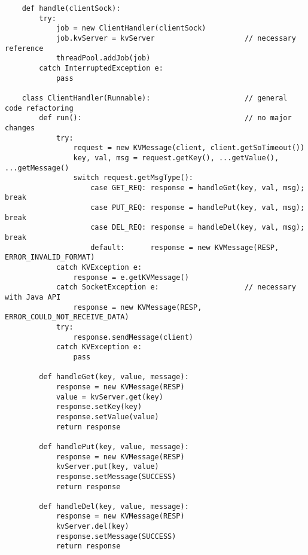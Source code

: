\begin{verbatim}
    def handle(clientSock):
        try:
            job = new ClientHandler(clientSock)
            job.kvServer = kvServer                     // necessary reference
            threadPool.addJob(job)
        catch InterruptedException e:
            pass

    class ClientHandler(Runnable):                      // general code refactoring
        def run():                                      // no major changes
            try:
                request = new KVMessage(client, client.getSoTimeout())
                key, val, msg = request.getKey(), ...getValue(), ...getMessage()
                switch request.getMsgType():
                    case GET_REQ: response = handleGet(key, val, msg); break
                    case PUT_REQ: response = handlePut(key, val, msg); break
                    case DEL_REQ: response = handleDel(key, val, msg); break
                    default:      response = new KVMessage(RESP, ERROR_INVALID_FORMAT)
            catch KVException e:
                response = e.getKVMessage()
            catch SocketException e:                    // necessary with Java API
                response = new KVMessage(RESP, ERROR_COULD_NOT_RECEIVE_DATA)
            try:
                response.sendMessage(client)
            catch KVException e:
                pass

        def handleGet(key, value, message):
            response = new KVMessage(RESP)
            value = kvServer.get(key)
            response.setKey(key)
            response.setValue(value)
            return response

        def handlePut(key, value, message):
            response = new KVMessage(RESP)
            kvServer.put(key, value)
            response.setMessage(SUCCESS)
            return response

        def handleDel(key, value, message):
            response = new KVMessage(RESP)
            kvServer.del(key)
            response.setMessage(SUCCESS)
            return response
\end{verbatim}

